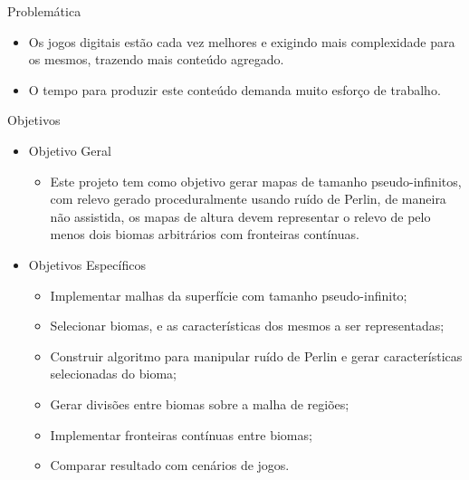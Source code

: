 \begin{frame}{Problemática}
    \begin{itemize} \setlength\itemsep{1em}
        \item Os jogos digitais estão cada vez melhores e exigindo mais
        complexidade para os mesmos, trazendo mais conteúdo agregado.
        \item O tempo para produzir este conteúdo demanda muito esforço de trabalho.
    \end{itemize}
\end{frame}


%    

\begin{frame}{Objetivos}
    \begin{itemize}
        \item Objetivo Geral
        \begin{itemize}
            \item Este projeto tem como objetivo gerar mapas de tamanho pseudo-infinitos, com 
            relevo gerado proceduralmente usando ruído 
            de Perlin, de maneira não assistida, os mapas de altura devem representar o 
            relevo de pelo menos dois biomas arbitrários com fronteiras contínuas.
        \end{itemize}
        \item Objetivos Específicos
        \begin{itemize}
            \item Implementar malhas da superfície com tamanho pseudo-infinito;
            \item Selecionar biomas, e as características dos mesmos a ser representadas;
            \item Construir algoritmo para manipular ruído de Perlin e gerar características
                selecionadas do bioma;
            \item Gerar divisões entre biomas sobre a malha de regiões;
            \item Implementar fronteiras contínuas entre biomas;
            \item Comparar resultado com cenários de jogos.
        \end{itemize}
    \end{itemize}
\end{frame}